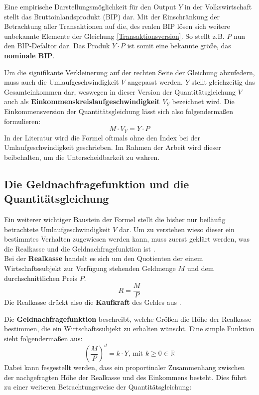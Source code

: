 Eine empirische Darstellungsmöglichkeit für den Output $Y$ in der Volkswirtschaft stellt das Bruttoinlandsprodukt (BIP) dar. Mit der Einschränkung der Betrachtung aller Transaktionen auf die, des realen BIP lösen sich weitere unbekannte Elemente der Gleichung \vref{Transaktionsversion}. So stellt z.B. $P$ nun den BIP-Defaltor dar. Das Produk $Y \cdot P$ ist somit eine bekannte größe, das \textbf{nominale BIP}\autocite*[125]{mankiw2017}.

Um die signifikante Verkleinerung auf der rechten Seite der Gleichung abzufedern, muss auch die Umlaufgeschwindigkeit $V$ angepasst werden. $Y$ stellt gleichzeitig das Gesamteinkommen dar, weswegen in dieser Version der Quantitätsgleichung $V$ auch als \textbf{Einkommenskreislaufgeschwindigkeit $V_Y$} bezeichnet wird. Die Einkommensversion der Quantitätsgleichung lässt sich also folgendermaßen formulieren:
\begin{equation}
    \tag{Einkommensversion}
    M \cdot V_Y = Y \cdot P
\end{equation}\label{Einkommensversion}
In der Literatur wird die Formel oftmals ohne den Index bei der Umlaufgeschwindigkeit geschrieben. Im Rahmen der Arbeit wird dieser beibehalten, um die Unterscheidbarkeit zu wahren.

\subsection{Die Geldnachfragefunktion und die Quantitätsgleichung}

Ein weiterer wichtiger Baustein der Formel stellt die bisher nur beiläufig betrachtete Umlaufgeschwindigkeit $V$ dar. Um zu verstehen wieso dieser ein bestimmtes Verhalten zugewiesen werden kann, muss zuerst geklärt werden, was die Realkasse und die Geldnachfragefunktion ist \autocite[12, Kapitel~3.2.3]{historyQunatitaetstheorie}.\\
Bei der \textbf{Realkasse} handelt es sich um den Quotienten der einem Wirtschaftssubjekt zur Verfügung stehenden Geldmenge $M$ und dem durchschnittlichen Preis $P$.
$$ R = \frac{M}{P}$$
Die Realkasse drückt also die \textbf{Kaufkraft} des Geldes aus \autocite[125f]{mankiw2017}.

Die \textbf{Geldnachfragefunktion} beschreibt, welche Größen die Höhe der Realkasse bestimmen, die ein Wirtschaftssubjekt zu erhalten wünscht.
Eine simple Funktion sieht folgendermaßen aus:
$$(\frac{M}{P})^d=k \cdot Y\text{, mit } k \geq 0 \in \mathbb{R}$$\label{Geldnachfragefunktion}
Dabei kann fesgestellt werden, dass ein proportinaler Zusammenhang zwischen der nachgefragten Höhe der Realkasse und des Einkommens besteht. Dies führt zu einer weiteren Betrachtungsweise der Quantitätsgleichung:

